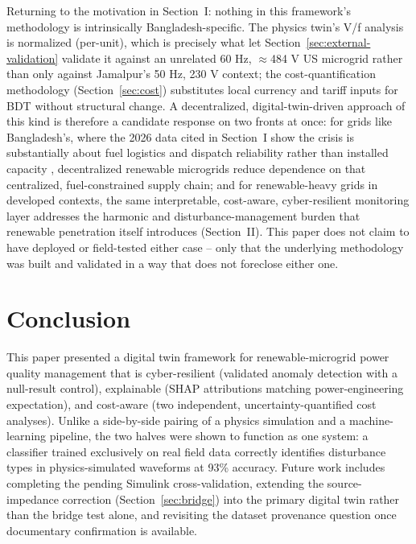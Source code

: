 \documentclass[conference]{IEEEtran}
\begin{document}
Returning to the motivation in Section~I: nothing in this framework's
methodology is intrinsically Bangladesh-specific. The physics twin's
V/f analysis is normalized (per-unit), which is precisely what let
Section~\ref{sec:external-validation} validate it against an
unrelated 60 Hz, $\approx$484 V US microgrid rather than only against
Jamalpur's 50 Hz, 230 V context; the cost-quantification methodology
(Section~\ref{sec:cost}) substitutes local currency and tariff inputs
for BDT without structural change. A decentralized, digital-twin-driven
approach of this kind is therefore a candidate response on two fronts
at once: for grids like Bangladesh's, where the 2026 data cited in
Section~I show the crisis is substantially about fuel logistics and
dispatch reliability rather than installed capacity
\cite{dailystar2026pdbplan,dailystar2026rooppur}, decentralized
renewable microgrids reduce dependence on that centralized,
fuel-constrained supply chain; and for renewable-heavy grids in
developed contexts, the same interpretable, cost-aware,
cyber-resilient monitoring layer addresses the harmonic and
disturbance-management burden that renewable penetration itself
introduces (Section~II). This paper does not claim to have deployed
or field-tested either case -- only that the underlying methodology
was built and validated in a way that does not foreclose either one.

\section{Conclusion}
This paper presented a digital twin framework for renewable-microgrid
power quality management that is cyber-resilient (validated anomaly
detection with a null-result control), explainable (SHAP attributions
matching power-engineering expectation), and cost-aware (two
independent, uncertainty-quantified cost analyses). Unlike a
side-by-side pairing of a physics simulation and a machine-learning
pipeline, the two halves were shown to function as one system: a
classifier trained exclusively on real field data correctly
identifies disturbance types in physics-simulated waveforms at 93\%
accuracy. Future work includes completing the pending Simulink
cross-validation, extending the source-impedance correction
(Section~\ref{sec:bridge}) into the primary digital twin rather than
the bridge test alone, and revisiting the dataset provenance question
once documentary confirmation is available.



\end{document}
